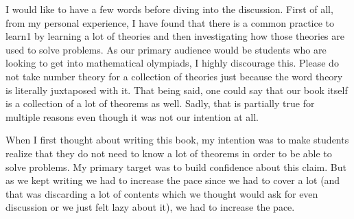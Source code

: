 \documentclass[leqno, 12pt]{book}
\begin{document}
%
%
%
%
%


	I would like to have a few words before diving into the discussion. First of all, from my personal experience, I have found that there is a common practice to learn1 by learning a lot of theories and then investigating how those theories are used to solve problems. As our primary audience would be students who are looking to get into mathematical olympiads, I highly discourage this. Please do not take number theory for a collection of theories just because the word theory is literally juxtaposed with it. That being said, one could say that our book itself is a collection of a lot of theorems as well. Sadly, that is partially true for multiple reasons even though it was not our intention at all.


When I first thought about writing this book, my intention was to make students realize that they do not need to know a lot of theorems in order to be able to solve problems. My primary target was to build confidence about this claim. But as we kept writing we had to increase the pace since we had to cover a lot (and that was  discarding a lot of contents which we thought would ask for even discussion or we just felt lazy about it), we had to increase the pace.
\end{document}
